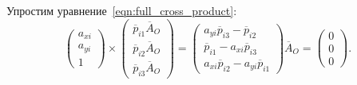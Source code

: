 \documentclass[12pt, a4paper]{article}
\begin{document}
Упростим уравнение~\ref{eqn:full_cross_product}:
\begin{equation}
    \begin{pmatrix}
        a_{xi}\\
        a_{yi}\\
        1
    \end{pmatrix} \times \begin{pmatrix}
        \overline{p}_{i1} \overline{A}_O\\
        \overline{p}_{i2} \overline{A}_O\\
        \overline{p}_{i3} \overline{A}_O
    \end{pmatrix} = \begin{pmatrix}
        a_{yi} \overline{p}_{i3} - \overline{p}_{i2} \\
        \overline{p}_{i1} - a_{xi} \overline{p}_{i3} \\
        a_{xi} \overline{p}_{i2} - a_{yi} \overline{p}_{i1}
    \end{pmatrix} \overline{A}_O = \begin{pmatrix}
        0\\
        0\\
        0
    \end{pmatrix}.
\label{eqn:cross_product_one_camera}
\end{equation}
\end{document}

